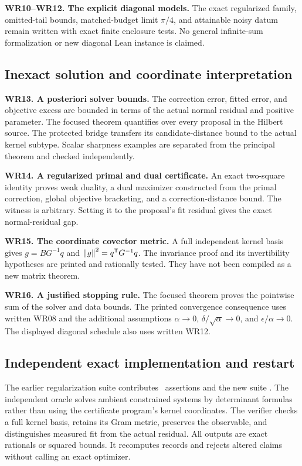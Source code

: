 \textbf{WR10--WR12. The explicit diagonal models.} The exact regularized family, omitted-tail bounds, matched-budget limit $\pi/4$, and attainable noisy datum remain written with exact finite enclosure tests. No general infinite-sum formalization or new diagonal Lean instance is claimed.

\subsection{Inexact solution and coordinate interpretation}
\textbf{WR13. A posteriori solver bounds.} The correction error, fitted error, and objective excess are bounded in terms of the actual normal residual and positive parameter. The focused theorem quantifies over every proposal in the Hilbert source. The protected bridge transfers its candidate-distance bound to the actual kernel subtype. Scalar sharpness examples are separated from the principal theorem and checked independently.

\textbf{WR14. A regularized primal and dual certificate.} An exact two-square identity proves weak duality, a dual maximizer constructed from the primal correction, global objective bracketing, and a correction-distance bound. The witness is arbitrary. Setting it to the proposal's fit residual gives the exact normal-residual gap.

\textbf{WR15. The coordinate covector metric.} A full independent kernel basis gives $g=BG^{-1}q$ and $\left\lVert g\right\rVert^2=q^{\mathsf T}G^{-1}q$. The invariance proof and its invertibility hypotheses are printed and rationally tested. They have not been compiled as a new matrix theorem.

\textbf{WR16. A justified stopping rule.} The focused theorem proves the pointwise sum of the solver and data bounds. The printed convergence consequence uses written WR08 and the additional assumptions $\alpha\to0$, $\delta/\sqrt\alpha\to0$, and $\epsilon/\alpha\to0$. The displayed diagonal schedule also uses written WR12.

\subsection{Independent exact implementation and restart}
The earlier regularization suite contributes \EditionRegularizationChecks\ assertions and the new suite \EditionInexactChecks. The independent oracle solves ambient constrained systems by determinant formulas rather than using the certificate program's kernel coordinates. The verifier checks a full kernel basis, retains its Gram metric, preserves the observable, and distinguishes measured fit from the actual residual. All outputs are exact rationals or squared bounds. It recomputes records and rejects altered claims without calling an exact optimizer.

